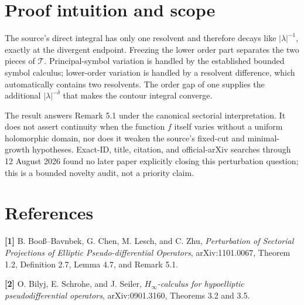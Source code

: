 \documentclass[11pt]{article}
\newcommand{\cT}{\mathcal T}
\begin{document}
\section*{Proof intuition and scope}
The source's direct integral has only one resolvent and therefore decays like
$|\lambda|^{-1}$, exactly at the divergent endpoint.  Freezing the lower
order part separates the two pieces of $\cT$.  Principal-symbol variation is
handled by the established bounded symbol calculus; lower-order variation is
handled by a resolvent difference, which automatically contains two
resolvents.  The order gap of one supplies the additional
$|\lambda|^{-\delta}$ that makes the contour integral converge.

The result answers Remark 5.1 under the canonical sectorial interpretation.
It does not assert continuity when the function $f$ itself varies without a
uniform holomorphic domain, nor does it weaken the source's fixed-cut and
minimal-growth hypotheses.  Exact-ID, title, citation, and official-arXiv
searches through 12 August 2026 found no later paper explicitly closing this
perturbation question; this is a bounded novelty audit, not a priority claim.

\section*{References}
\begingroup\raggedright
\textbf{[1]} B. Boo\ss--Bavnbek, G. Chen, M. Lesch, and C. Zhu,
\emph{Perturbation of Sectorial Projections of Elliptic
Pseudo-differential Operators}, arXiv:1101.0067, Theorem 1.2,
Definition 2.7, Lemma 4.7, and Remark 5.1.

\textbf{[2]} O. Bilyj, E. Schrohe, and J. Seiler,
\emph{$H_\infty$-calculus for hypoelliptic pseudodifferential operators},
arXiv:0901.3160, Theorems 3.2 and 3.5.
\par\endgroup
\end{document}
